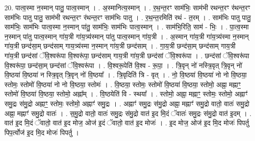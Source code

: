 \documentclass[17pt]{extarticle}
\begin{document}
20. पात्व॒स्मा न॒स्मान् पातु॒ पात्व॒स्मान् । . अ॒स्मानित्य॒स्मान् । . र॒थ॒न्त॒रꣳ साम॑भिः॒ साम॑भी रथन्त॒रꣳ र॑थन्त॒रꣳ साम॑भिः पातु पातु॒ साम॑भी रथन्त॒रꣳ र॑थन्त॒रꣳ साम॑भिः पातु । . र॒थ॒न्त॒रमिति॑ रथं - त॒रम् । . साम॑भिः पातु पातु॒ साम॑भिः॒ साम॑भिः पात्व॒स्मा न॒स्मान् पा॑तु॒ साम॑भिः॒ साम॑भिः पात्व॒स्मान् । . साम॑भि॒रिति॒ साम॑ - भिः॒ । . पा॒त्व॒स्मा न॒स्मान् पा॑तु पात्व॒स्मान् गा॑य॒त्री गा॑य॒त्र्य॑स्मान् पा॑तु पात्व॒स्मान् गा॑य॒त्री । . अ॒स्मान् गा॑य॒त्री गा॑य॒त्र्य॑स्मा न॒स्मान् गा॑य॒त्री छन्द॑सा॒म् छन्द॑साम् गाय॒त्र्य॑स्मा न॒स्मान् गा॑य॒त्री छन्द॑साम् । . गा॒य॒त्री छन्द॑सा॒म् छन्द॑साम् गाय॒त्री गा॑य॒त्री छन्द॑सां ॅवि॒श्वरू॑पा वि॒श्वरू॑पा॒ छन्द॑साम् गाय॒त्री गा॑य॒त्री छन्द॑सां ॅवि॒श्वरू॑पा । . छन्द॑सां ॅवि॒श्वरू॑पा वि॒श्वरू॑पा॒ छन्द॑सा॒म् छन्द॑सां ॅवि॒श्वरू॑पा । . वि॒श्वरू॒पेति॑ वि॒श्व - रू॒पा॒ । . त्रि॒वृन् नो॑ नस्त्रि॒वृत् त्रि॒वृन् नो॑ वि॒ष्ठया॑ वि॒ष्ठया॑ न स्त्रि॒वृत् त्रि॒वृन् नो॑ वि॒ष्ठया᳚ । . त्रि॒वृदिति॑ त्रि - वृत् । . नो॒ वि॒ष्ठया॑ वि॒ष्ठया॑ नो नो वि॒ष्ठया॒ स्तोमः॒ स्तोमो॑ वि॒ष्ठया॑ नो नो वि॒ष्ठया॒ स्तोमः॑ । . वि॒ष्ठया॒ स्तोमः॒ स्तोमो॑ वि॒ष्ठया॑ वि॒ष्ठया॒ स्तोमो॒ अह्ना॒ मह्नाꣳ॒॒ स्तोमो॑ वि॒ष्ठया॑ वि॒ष्ठया॒ स्तोमो॒ अह्ना᳚म् । . वि॒ष्ठयेति॑ वि - स्थया᳚ । . स्तोमो॒ अह्ना॒ मह्नाꣳ॒॒ स्तोमः॒ स्तोमो॒ अह्नाꣳ॑ समु॒द्रः स॑मु॒द्रो अह्नाꣳ॒॒ स्तोमः॒ स्तोमो॒ अह्नाꣳ॑ समु॒द्रः । . अह्नाꣳ॑ समु॒द्रः स॑मु॒द्रो अह्ना॒ मह्नाꣳ॑ समु॒द्रो वातो॒ वातः॑ समु॒द्रो अह्ना॒ मह्नाꣳ॑ समु॒द्रो वातः॑ । . स॒मु॒द्रो वातो॒ वातः॑ समु॒द्रः स॑मु॒द्रो वात॑ इ॒द मि॒दं ॅवातः॑ समु॒द्रः स॑मु॒द्रो वात॑ इ॒दम् । . वात॑ इ॒द मि॒दं ॅवातो॒ वात॑ इ॒द मोज॒ ओज॑ इ॒दं ॅवातो॒ वात॑ इ॒द मोजः॑ । . इ॒द मोज॒ ओज॑ इ॒द मि॒द मोजः॑ पिपर्तु पिप॒र्त्वोज॑ इ॒द मि॒द मोजः॑ पिपर्तु । \newline
\end{document}

